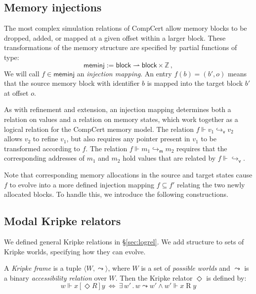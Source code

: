 \documentclass[acmsmall,authordraft]{acmart}
\newcommand{\kw}[1]{\ensuremath{ \mathsf{#1} }}
\newcommand{\ifr}[1]{\mathrel{[{#1}]}}
\begin{document}

\subsection{Memory injections} \label{sec:meminj} %

The most complex simulation relations of CompCert
allow memory blocks to be dropped, added, or
mapped at a given offset within a larger block.
These transformations of the memory structure
are specified by partial functions of type:
\[
  \kw{meminj} := \kw{block} \rightharpoonup \kw{block} \times \mathbb{Z} \,,
\]
We will call $f \in \kw{meminj}$
an \emph{injection mapping}.
An entry $f(b) = (b', o)$
means that the source memory block with identifier $b$
is mapped into the target block $b'$
at offset $o$.

As with refinement and extension,
an injection mapping determines both
a relation on values and
a relation on memory states,
which work together
as a logical relation for the CompCert memory model.
The relation $f \Vdash v_1 \hookrightarrow_\kw{v} v_2$
allows $v_2$ to refine $v_1$,
but also requires any pointer present in $v_1$ 
to be transformed according to $f$.
The relation $f \Vdash m_1 \hookrightarrow_\kw{m} m_2$
requires that the corresponding addresses of $m_1$ and $m_2$
hold values that are related by $f \Vdash {\hookrightarrow_\kw{v}}$.

Note that corresponding memory allocations
in the source and target states cause $f$ to
evolve into a more defined injection mapping $f \subseteq f'$
relating the two newly allocated blocks.
To handle this,
we introduce the following constructions.


\subsection{Modal Kripke relators} %

We defined general Kripke relations in \S\ref{sec:logrel}.
We add structure to sets of Kripke worlds,
specifying how they can evolve.

\begin{definition} %
A \emph{Kripke frame} is a tuple
$\langle W, {\leadsto} \rangle$, where
$W$ is a set of \emph{possible worlds} and
$\leadsto$ is a
binary \emph{accessibility relation} over $W$.
Then the Kripke relator $\Diamond$ is defined by:
\[
  w \Vdash x \ifr{\Diamond R} y \: \Leftrightarrow \:
    \exists \, w' \,.\, w \leadsto w' \wedge
      w' \Vdash x \mathrel{R} y
\]
\end{definition}
\end{document}
